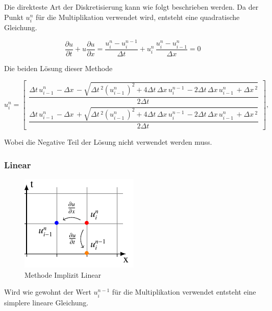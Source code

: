 	Die direkteste Art der Diskretisierung kann wie folgt beschrieben werden.
	Da der Punkt $u_{i}^{n}$ f\"ur die Multiplikation verwendet wird, entsteht eine quadratische Gleichung.


\begin{equation}
\frac {\partial u}{\partial t}+u{\frac {\partial u}{\partial x}} = \frac{u_{i}^{n}-u_{i}^{n-1}}{\Delta t}+ u_{i}^{n}\, \frac{u_{i}^{n}-u_{i-1}^{n}}{\Delta x}=0
\end{equation}

	Die beiden L\"osung dieser Methode

\begin{equation}
  u_{i}^{n} = \begin{bmatrix}
     \dfrac{\Delta{t}\, u^{n}_{i-1}\, - \Delta{x}\, - \sqrt{\Delta{t}\,^{2} \left(u^{n}_{i-1}\,\right)^{2} + 4 \Delta{t}\, \Delta{x}\, u^{n-1}_{i}\, - 2 \Delta{t}\, \Delta{x}\, u^{n}_{i-1}\, + \Delta{x}\,^{2}}}{2 \Delta{t}\,} \\[15pt]
     \dfrac{\Delta{t}\, u^{n}_{i-1}\, - \Delta{x}\, + \sqrt{\Delta{t}\,^{2} \left(u^{n}_{i-1}\,\right)^{2} + 4 \Delta{t}\, \Delta{x}\, u^{n-1}_{i}\, - 2 \Delta{t}\, \Delta{x}\, u^{n}_{i-1}\, + \Delta{x}\,^{2}}}{2 \Delta{t}\,}
  \end{bmatrix},
\end{equation}

	Wobei die Negative Teil der L\"osung nicht verwendet werden muss.

\subsubsection{Linear}
\label{burgers:sec:imp_lin}
     \begin{figure}
	\centering
	\includegraphics[height=.4\textwidth]{papers/burgers/BurgersEquation/tikz/linear5/linear5.pdf}
	\caption{Methode Implizit Linear}
	\label{burgers:fig:linear5}
	\end{figure}
	
	Wird wie gewohnt der Wert  $u_{i}^{n-1}$ f\"ur die Multiplikation verwendet entsteht eine simplere lineare Gleichung.
	
